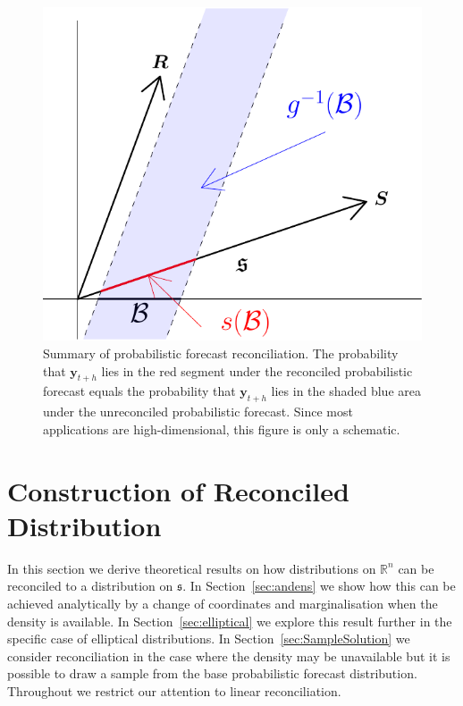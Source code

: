 \documentclass[a4paper,12pt]{article}
\theoremstyle{definition}
\begin{document}
\begin{figure}[!htb]
	\centering \includegraphics[height=0.3\textheight]{probforerec_schematic.pdf}
	\caption{Summary of probabilistic forecast reconciliation. The probability that $\bm{y}_{t+h}$ lies in the red segment under the reconciled probabilistic forecast equals the probability that $\bm{y}_{t+h}$ lies in the shaded blue area under the unreconciled probabilistic forecast. Since most applications are high-dimensional, this figure is only a schematic.}\label{fig:probfr_sch}
\end{figure}


\section{Construction of Reconciled Distribution} \label{sec:AnalyticalSolution}

In this section we derive theoretical results on how distributions on $\mathbb{R}^n$ can be reconciled to a distribution on $\mathfrak{s}$. In Section~\ref{sec:andens} we show how this can be achieved analytically by a change of coordinates and marginalisation when the density is available. In Section~\ref{sec:elliptical} we explore this result further in the specific case of elliptical distributions. In Section~\ref{sec:SampleSolution} we consider reconciliation in the case where the density may be unavailable but it is possible to draw a sample from the base probabilistic forecast distribution. Throughout we restrict our attention to linear reconciliation.
\end{document}

